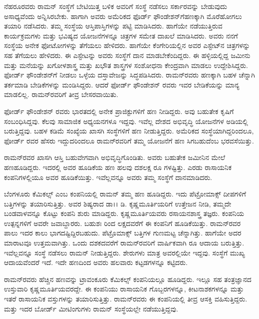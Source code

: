 \vskip 2pt

ನೆಹರೂರವರು ರಾಮನ್ ಸಂಸ್ಥೆಗೆ ಬೇಟಿಯಿತ್ತ ಬಳಿಕ ಅವರಿಗೆ ಸಂಸ್ಥೆ ನಡೆಸಲು ಸರ್ಕಾರವನ್ನು ಬೇಡುವುದು ಅಸಾಧ್ಯವೆಂದು ಅನ್ನಿಸಿರಬೇಕು. ಹಾಗಾಗಿ ಅವರು ಅಮೆರಿಕದ ಫೊರ್ಡ್ ಫೌಂಡೇಶನ್‌ಗೆ\break ಹಣಕ್ಕಾಗಿ ಮೊರೆಹೋಗಲು ತಯಾರಿ ನಡೆಸಿದರು. ತಮ್ಮ ಸಂಸ್ಥೆಯ ಆಸ್ತಿಪಾಸ್ತಿಗಳನ್ನು ಪಟ್ಟಿ ಮಾಡಿಸಿದರು. ಹಾಗೆಯೇ ನಡೆಯುತ್ತಿರುವ ಕಾರ್ಯಕ್ರಮಗಳು ಮತ್ತು ಭವಿಷ್ಯದ ಯೋಜನೆಗಳನ್ನೂ ಚಿತ್ರಗಳ ಸಮೇತ ದಾಖಲೆ ಮಾಡಿಸಿದರು. ಅವರು ನನಗೆ ಸಂಸ್ಥೆಯ ಅನೇಕ ಫೋಟೋಗಳನ್ನು ತೆಗೆಯಲು ಹೇಳಿದರು. ಹಾಗೆಯೇ ಕೆಂಗೇರಿಯಲ್ಲಿನ ಅವರ ಎಸ್ಟೇಟ್‍ನ ಚಿತ್ರಗಳನ್ನು ಸಹ ತೆಗೆಯಲು ಹೇಳಿದರು. ಈ ಎಸ್ಟೇಟನ್ನು ಅವರು ಸಂಸ್ಥೆಗೆ ದಾನ ಮಾಡಬೇಕೆಂದಿದ್ದರು. ಈ ಹಳ್ಳಿಯಲ್ಲಿದ್ದ ಜಮೀನು ಮತ್ತು ಮನೆಯನ್ನು ಖಗೋಳಶಾಸ್ತ್ರ ಮತ್ತು ಖಭೌತ ಶಾಸ್ತ್ರಗಳ ಸಂಶೋಧನಾ ಕೇಂದ್ರವಾಗಿ ಮಾಡಲು ಉದ್ದೇಶಿಸಿದ್ದರು. ಫೋರ್ಡ್ ಫೌಂಡೇಶನ್‍ಗೆ ನೀಡಲು ಒಳ್ಳೆಯ ದಸ್ತಾವೇಜನ್ನು ಸಿದ್ಧಪಡಿಸಿದರು. ರಾಮನ್‍ರವರು ಹಣಕ್ಕಾಗಿ ಬಹಳ ಚೆನ್ನಾಗಿ ತರ್ಕಮಾಡಿ ಬೇಡಿಕೆಗಳನ್ನು ಮಂಡಿಸಿದ್ದರು. ಆದರೆ ಫೋರ್ಡ್ ಫೌಂಡೇಶನ್ ರವರು ಇವರ ಬೇಡಿಕೆಯನ್ನು ಮಾನ್ಯ ಮಾಡಲಿಲ್ಲ. ರಾಮನ್‍ರವರಿಗೆ ತೀವ್ರ ಬೇಸರವಾಯಿತು.

\vskip 2pt

ಫೋರ್ಡ್ ಫೌಂಡೇಶನ್ ರವರು ಭಾರತದಲ್ಲಿ ಅನೇಕ ಪ್ರಾಜಿಕ್ಟುಗಳಿಗೆ ಹಣ ನೀಡಿದ್ದರು. ಅವು ಬಹುತೇಕ ಕೃಷಿಗೆ ಸಂಬಂಧಿಸಿದ್ದವು. ಕೆಲವು ಸಾಮಾಜಿಕ ಅಧ್ಯಯನಗಳೂ ಇದ್ದವು. ಇವೆಲ್ಲ ದೇಶದ ಅಭಿವೃದ್ಧಿ ಯೋಜನೆಗಳ ಅಡಿಯಲ್ಲಿ ಬರುತ್ತಿದ್ದವು. ಬಹಳ ಕಡಿಮೆ ಸಂಖ್ಯೆಯ ಖಾಸಗಿ ಸಂಸ್ಥೆಗಳಿಗೆ ಹಣ ನೀಡುತ್ತಿದ್ದರು. ಅಮೆರಿಕದ ಸಂಸ್ಥೆಯಾಗಿದ್ದರಿಂದಲೂ, ಫೋರ್ಡ್ ರವರ ಹೆಸರು ಇದ್ದುದರಿಂದಲೂ ರಾಮನ್‍ರವರಿಗೆ ತಮ್ಮ ಯೋಜನೆಗೆ ಹಣ ಸಿಗಬಹುದೆಂಬ ಭರವಸೆಯಿತ್ತು.

ರಾಮನ್‍ರವರ ಖಾಸಗಿ ಆಸ್ತಿ ಬಹುವೇಗವಾಗಿ ಅಭಿವೃದ್ಧಿಗೊಂಡಿತು. ಅವರು ಬಹುತೇಕ ಜಮೀನಿನ ಮೇಲೆ ಹಣಹೂಡಿದ್ದರು. ಇದರಲ್ಲಿ ಅವರ ಹೂಡಿಕೆಯ ಹಣ ಹಲವು ದಶಲಕ್ಷ ರೂ ಗಳಷ್ಟಿತ್ತು. ಎರಡು ರಾಸಾಯನಿಕ ಕಂಪನಿಗಳಲ್ಲಿಯೂ ಅವರ ಹೂಡಿಕೆಯಿತ್ತು. ಇವೆಲ್ಲವನ್ನೂ ಅವರು ತಮ್ಮ ಸಂಸ್ಥೆಗೆ ದಾನಮಾಡಿದರು.

ಬೆಂಗಳೂರು ಕೆಮಿಕಲ್ಸ್ ಎಂಬ ಕಂಪನಿಯಲ್ಲಿ ರಾಮನ್ ತಮ್ಮ ಹಣ ಹೂಡಿದ್ದರು. ಇದು ಪೆಟ್ರೋಮಾಕ್ಸ್ ದೀಪಗಳಿಗೆ ಬತ್ತಿಗಳನ್ನು ತಯಾರಿಸುತ್ತಿತ್ತು. ಅವರ ಶಿಷ್ಯರಾದ ಡಾ।। ಡಿ. ಕೃಷ್ಣಮೂರ್ತಿ\break ಯರಿಗೆ ಉತ್ತೇಜನ ನೀಡಿ, ತಮ್ಮದೇ ಬಂಡವಾಳವನ್ನೂ ಕೊಟ್ಟು ಕಂಪನಿ ಶುರು ಮಾಡಿದ್ದರು. ಕೃಷ್ಣಮೂರ್ತಿ\-ಯವರು ರಸಾಯನಶಾಸ್ತ್ರ ತಜ್ಞರು. ಕಂಪನಿಯ ಉತ್ಪನ್ನಗಳಿಗೆ ಅವರೇ ಜವಾಬ್ದಾರರು. ಬಹುಶಃ  ರಿಂದ  ಲಕ್ಷದವರೆಗೆ ಈ ಕಂಪನಿಗೆ ಹೂಡಿಕೆಯಿತ್ತು. ರಾಮನ್‍ರವರ ಪಾಲು ಇದರ ಕಾಲು ಭಾಗದಷ್ಟಿದ್ದಿರಬಹುದು. ಪೆಟ್ರೊಮಾಕ್ಸ್ ಬತ್ತಿಗಳ ಗುಣಮಟ್ಟ ಚೆನ್ನಾಗಿತ್ತು. ಹಾಗೆಯೇ ಅದರ ಮಾರಾಟವೂ ಉತ್ತಮವಾಗಿತ್ತು. ಒಂದು ದಶಕದವರೆಗೆ ರಾಮನ್‍ರವರಿಗೆ ವಾರ್ಷಿಕವಾಗಿ  ರೂ ಆದಾಯ ಬರುತ್ತಿತ್ತು. ಇವೆಲ್ಲವನ್ನೂ ಸಂಸ್ಥೆ ನಡೆಸಲು ರಾಮನ್ ನೀಡುತ್ತಿದ್ದರು. ಶೇರುಗಳು ಮಾತ್ರ ಅವರಲ್ಲಿಯೇ ಇದ್ದವು. ಸಂಸ್ಥೆಗೆ ಮುಖ್ಯ ಆದಾಯವೆಂದರೆ ಇದೆ. ಇದೇ ಹಣದಿಂದ ಅವರು ಹಲವಾರು ಕಟ್ಟಡಗಳನ್ನೂ ಕಟ್ಟಿದರು.

ರಾಮನ್‍ರವರು ಹೆಚ್ಚಿನ ಹಣವನ್ನು ಟ್ರಾವಂಕೂರು ಕೆಮಿಕಲ್ಸ್ ಕಂಪನಿಯಲ್ಲೂ ಹೂಡಿದ್ದರು. ಇಲ್ಲೂ ಸಹ ತಂತ್ರಜ್ಞಾನದ ಉಸ್ತುವಾರಿ ಕೃಷ್ಣಮೂರ್ತಿಯವರದ್ದೇ. ಈ ಕಂಪನಿಯು ರಾಸಾಯನಿಕ ಗೊಬ್ಬರಗಳನ್ನೂ, ಕೀಟನಾಶಕಗಳನ್ನೂ ಮತ್ತು ಇತರೆ ರಾಸಾಯನಿಕ ವಸ್ತುಗಳನ್ನು ತಯಾರಿಸುತ್ತಿತ್ತು. ರಾಮನ್‍ರವರು ಈ ಕಂಪನಿಯಲ್ಲಿ ತೀವ್ರ ಆಸಕ್ತಿ ವಹಿಸುತ್ತಿದ್ದರು. ಮತ್ತು ಇದರ ಬೋರ್ಡ್ ಮೀಟಿಂಗುಗಳು ರಾಮನ್ ಸಂಸ್ಥೆಯಲ್ಲೇ ನಡೆಯುತ್ತಿದ್ದವು.


